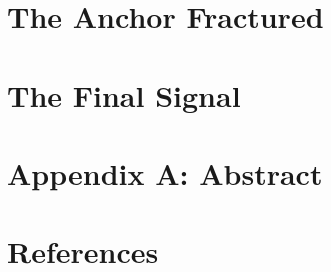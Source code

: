 \documentclass[12pt]{book}
\begin{document}
\chapter{The Anchor Fractured}


\chapter{The Final Signal}



\appendix

\chapter*{Appendix A: Abstract}



\backmatter

\chapter*{References}

\end{document}
